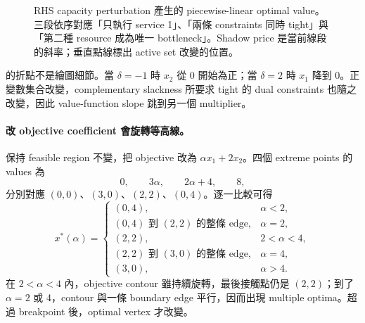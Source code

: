 \documentclass[11pt,a4paper,oneside,openany]{book}
\begin{document}
\begin{figure}[htbp]
\centering
{}
\caption{RHS capacity perturbation 產生的 piecewise-linear optimal value。三段依序對應「只執行 service 1」、「兩條 constraints 同時 tight」與「第二種 resource 成為唯一 bottleneck」。Shadow price 是當前線段的斜率；垂直點線標出 active set 改變的位置。}
\label{fig:shadow-price-piecewise}
\end{figure}

 的折點不是繪圖細節。當 $\delta=-1$ 時 $x_2$ 從 0 開始為正；當 $\delta=2$ 時 $x_1$ 降到 0。正變數集合改變，complementary slackness 所要求 tight 的 dual constraints 也隨之改變，因此 value-function slope 跳到另一個 multiplier。

\paragraph{改 objective coefficient 會旋轉等高線。}
保持 feasible region 不變，把 objective 改為 $\alpha x_1+2x_2$。四個 extreme points 的 values 為
\[
0,\qquad 3\alpha,\qquad 2\alpha+4,\qquad 8,
\]
分別對應 $(0,0)$、$(3,0)$、$(2,2)$、$(0,4)$。逐一比較可得
\[
x^*(\alpha)=
\begin{cases}
(0,4), & \alpha<2,\\
\text{$(0,4)$ 到 $(2,2)$ 的整條 edge}, & \alpha=2,\\
(2,2), & 2<\alpha<4,\\
\text{$(2,2)$ 到 $(3,0)$ 的整條 edge}, & \alpha=4,\\
(3,0), & \alpha>4.
\end{cases}
\]
在 $2<\alpha<4$ 內，objective contour 雖持續旋轉，最後接觸點仍是 $(2,2)$；到了 $\alpha=2$ 或 4，contour 與一條 boundary edge 平行，因而出現 multiple optima。超過 breakpoint 後，optimal vertex 才改變。
\end{document}
